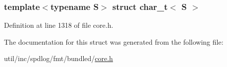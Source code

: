 \subsubsection*{template$<$typename S$>$\newline
struct char\+\_\+t$<$ S $>$}



Definition at line 1318 of file core.\+h.



The documentation for this struct was generated from the following file\+:\begin{DoxyCompactItemize}
\item 
util/inc/spdlog/fmt/bundled/\hyperlink{core_8h}{core.\+h}\end{DoxyCompactItemize}
